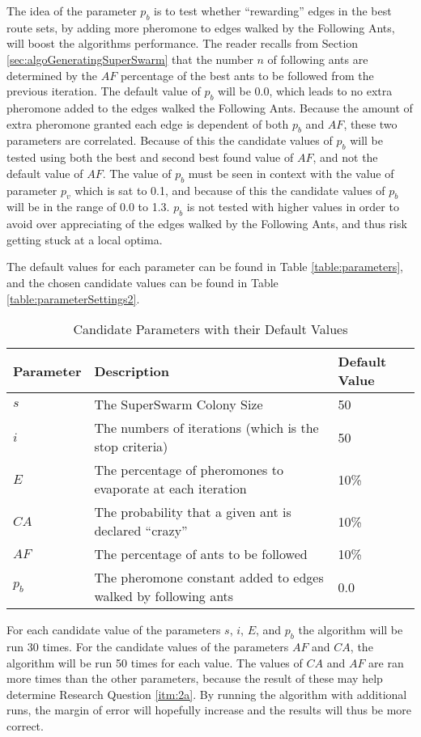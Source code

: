 The idea of the parameter $p_b$ is to test whether ``rewarding'' edges in the best route sets, by adding more pheromone to edges walked by the Following Ants, will boost the algorithms performance. The reader recalls from Section \vref{sec:algoGeneratingSuperSwarm} that the number $n$ of following ants are determined by the $AF$ percentage of the best ants to be followed from the previous iteration. The default value of $p_b$ will be 0.0, which leads to no extra pheromone added to the edges walked the Following Ants. Because the amount of extra pheromone granted each edge is dependent of both $p_b$ and $AF$, these two parameters are correlated. Because of this the candidate values of $p_b$ will be tested using both the best and second best found value of $AF$, and not the default value of $AF$. The value of $p_b$ must be seen in context with the value of parameter $p_v$ which is sat to 0.1, and because of this the candidate values of $p_b$ will be in the range of 0.0 to 1.3. $p_b$ is not tested with higher values in order to avoid over appreciating of the edges walked by the Following Ants, and thus risk getting stuck at a local optima.  

The default values for each parameter can be found in Table \vref{table:parameters}, and the chosen candidate values can be found in Table \vref{table:parameterSettings2}.

\begin{table}[H]
	\small
	\begin{tabular}{|l|l|l|}
    	\hline
    	Parameter & Description & Default Value\\
    	\hline
    	$s$ & The SuperSwarm Colony Size & 50\\
    	$i$ & The numbers of iterations (which is the stop criteria) & 50\\
    	$E$ & The percentage of pheromones to evaporate at each iteration & 10\%\\
    	$CA$ & The probability that a given ant is declared ``crazy'' & 10\%\\
    	$AF$ & The percentage of ants to be followed & 10\%\\
        $p_b$ & The pheromone constant added to edges walked by following ants & 0.0\\
   	    \hline
    \end{tabular}
    \caption {Candidate Parameters with their Default Values}
    \label{table:parameters}
\end{table}

For each candidate value of the parameters $s$, $i$, $E$, and $p_b$ the algorithm will be run 30 times.  For the candidate values of the parameters $AF$ and $CA$, the algorithm will be run 50 times for each value. 
The values of $CA$ and $AF$ are ran more times than the other parameters, because the result of these may help determine Research Question \vref{itm:2a}. By running the algorithm with additional runs, the margin of error will hopefully increase and the results will thus be more correct.


